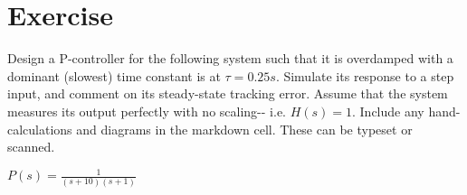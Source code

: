 \documentclass[11pt]{article}
\begin{document}
    \section{Exercise}\label{exercise}

Design a P-controller for the following system such that it is
overdamped with a dominant (slowest) time constant is at \(\tau=0.25s\).
Simulate its response to a step input, and comment on its steady-state
tracking error. Assume that the system measures its output perfectly
with no scaling-\/- i.e. \(H(s)=1\). Include any hand-calculations and
diagrams in the markdown cell. These can be typeset or scanned.

\(P(s) = \frac{1}{(s+10)(s+1)}\)


    
    
    
    
\end{document}
